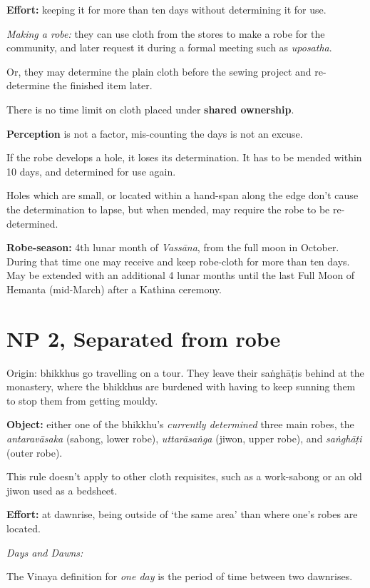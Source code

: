 \textbf{Effort:} keeping it for more than ten days without determining
it for use.

\emph{Making a robe:} they can use cloth from the stores to make a robe
for the community, and later request it during a formal meeting such as
\emph{uposatha}.

Or, they may determine the plain cloth before the sewing project and
re-determine the finished item later.

There is no time limit on cloth placed under \textbf{shared ownership}.

\textbf{Perception} is not a factor, mis-counting the days is not an
excuse.

If the robe develops a hole, it loses its determination. It has to be
mended within 10 days, and determined for use again.

Holes which are small, or located within a hand-span along the edge
don't cause the determination to lapse, but when mended, may require the
robe to be re-determined.

\textbf{Robe-season:} 4th lunar month of \emph{Vassāna}, from the full
moon in October. During that time one may receive and keep robe-cloth
for more than ten days. May be extended with an additional 4 lunar
months until the last Full Moon of Hemanta (mid-March) after a Kathina
ceremony.

\section{NP 2, Separated from robe}

Origin: bhikkhus go travelling on a tour. They leave their saṅghāṭis
behind at the monastery, where the bhikkhus are burdened with having to
keep sunning them to stop them from getting mouldy.

\textbf{Object:} either one of the bhikkhu's \emph{currently determined}
three main robes, the \emph{antaravāsaka} (sabong, lower robe),
\emph{uttarāsaṅga} (jiwon, upper robe), and \emph{saṅghāṭi} (outer
robe).

This rule doesn't apply to other cloth requisites, such as a work-sabong
or an old jiwon used as a bedsheet.

\textbf{Effort:} at dawnrise, being outside of `the same area' than
where one's robes are located.

\emph{Days and Dawns:}

The Vinaya definition for \emph{one day} is the period of time between
two dawnrises.


